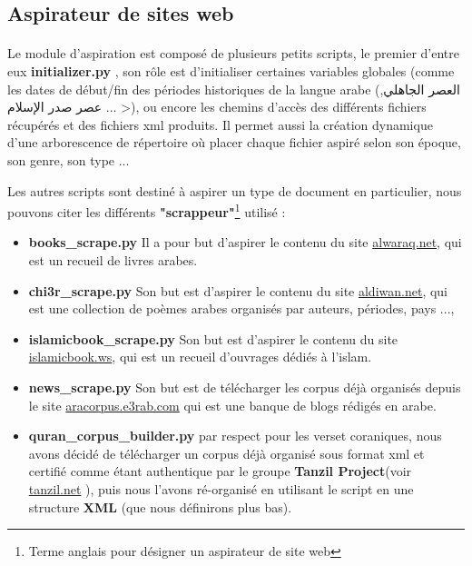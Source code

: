 \documentclass[]{report}
\begin{document}
		\subsection{Aspirateur de sites web}
			\paragraph{}
			Le module d'aspiration est composé de plusieurs petits scripts,
			le premier d'entre eux  \textbf{initializer.py} , son rôle est d'initialiser certaines
			variables globales (comme les dates de début/fin des périodes historiques de la langue arabe (\<العصر الجاهلي, عصر صدر الإسلام ... >), ou encore les chemins d'accès des différents fichiers récupérés et des fichiers xml produits.
			Il permet aussi la création dynamique d'une arborescence de répertoire où placer chaque fichier aspiré selon son époque, son genre, son type ...
			\par 
			Les autres scripts sont destiné à aspirer un type de document en particulier, nous pouvons citer les différents \textbf{"scrappeur"}\footnote{Terme anglais pour désigner un aspirateur de site web} utilisé : 
			\begin{itemize}
				\item \textbf{books\_scrape.py} Il a pour but d'aspirer le contenu du site \href{http://www.alwaraq.net/Core/index.jsp?option=1}{alwaraq.net}, qui est un recueil de livres arabes.
				
				\item \textbf{chi3r\_scrape.py} Son but est d'aspirer le contenu du site \href{https://www.aldiwan.net/}{aldiwan.net}, qui est une collection de poèmes arabes organisés par auteurs, périodes, pays ..., 
				
				\item \textbf{islamicbook\_scrape.py} Son but est d'aspirer le contenu du site \href{https://www.islamicbook.ws/}{islamicbook.ws}, qui est un 
				recueil d'ouvrages dédiés à l'islam.
				
				\item \textbf{news\_scrape.py} Son but est de télécharger les corpus déjà organisés depuis le site \href{http://aracorpus.e3rab.com/}{aracorpus.e3rab.com} qui est une banque de blogs rédigés en arabe.
%				
				
				\item \textbf{quran\_corpus\_builder.py} par respect pour les verset coraniques, nous avons décidé de télécharger un corpus déjà organisé sous format xml et certifié comme étant authentique par le groupe \textbf{Tanzil Project}(voir \href{http://tanzil.net/#19:3}{tanzil.net} ), puis nous l'avons ré-organisé en utilisant le script en une structure \textbf{XML} (que nous définirons plus bas).
				
			\end{itemize} 
\end{document}
